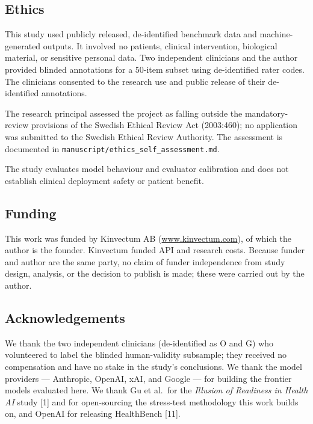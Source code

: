 \documentclass[
  11pt,
]{article}
\begin{document}
\subsection{Ethics}\label{ethics}

This study used publicly released, de-identified benchmark data and
machine-generated outputs. It involved no patients, clinical
intervention, biological material, or sensitive personal data. Two
independent clinicians and the author provided blinded annotations for a
50-item subset using de-identified rater codes. The clinicians consented
to the research use and public release of their de-identified
annotations.

The research principal assessed the project as falling outside the
mandatory-review provisions of the Swedish Ethical Review Act
(2003:460); no application was submitted to the Swedish Ethical Review
Authority. The assessment is documented in
\texttt{manuscript/ethics\_self\_assessment.md}.

The study evaluates model behaviour and evaluator calibration and does
not establish clinical deployment safety or patient benefit.

\subsection{Funding}\label{funding}

This work was funded by Kinvectum AB
(\href{https://www.kinvectum.com}{www.kinvectum.com}), of which the
author is the founder. Kinvectum funded API and research costs. Because
funder and author are the same party, no claim of funder independence
from study design, analysis, or the decision to publish is made; these
were carried out by the author.

\subsection{Acknowledgements}\label{acknowledgements}

We thank the two independent clinicians (de-identified as O and G) who
volunteered to label the blinded human-validity subsample; they received
no compensation and have no stake in the study's conclusions. We thank
the model providers --- Anthropic, OpenAI, xAI, and Google --- for
building the frontier models evaluated here. We thank Gu et al.~for the
\emph{Illusion of Readiness in Health AI} study {[}1{]} and for
open-sourcing the stress-test methodology this work builds on, and
OpenAI for releasing HealthBench {[}11{]}.
\end{document}
